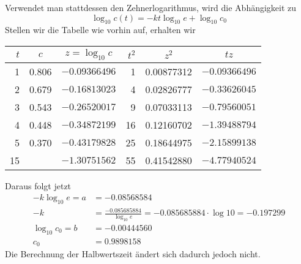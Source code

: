 \begin{loesung}
Verwendet man stattdessen den Zehnerlogarithmus, wird die Abhängigkeit
zu
$$
\log_{10} c(t)=-kt\log_{10}e+\log_{10}c_0
$$
Stellen wir die Tabelle wie vorhin auf, erhalten wir
\begin{center}
\begin{tabular}{rccrcc}
$t$&$c$&$z=\log_{10} c$&$t^2$&$z^2$&$tz$\\
\hline
1&0.806&$-0.09366496$&1&0.00877312&$-0.09366496$\\
2&0.679&$-0.16813023$&4&0.02826777&$-0.33626045$\\
3&0.543&$-0.26520017$&9&0.07033113&$-0.79560051$\\
4&0.448&$-0.34872199$&16&0.12160702&$-1.39488794$\\
5&0.370&$-0.43179828$&25&0.18644975&$-2.15899138$\\
\hline
15&    &$-1.30751562$&55&0.41542880&$-4.77940524$\\
\end{tabular}
\end{center}
Daraus folgt jetzt
\begin{align*}
-k\log_{10}e=a&=-0.08568584\\
-k&=\frac{-0.085685884}{\log_{10}e}=-0.085685884\cdot \log 10
=
-0.197299
\\
\log_{10}c_0=b&=-0.00444560\\
c_0&=0.9898158
\end{align*}
Die Berechnung der Halbwertszeit ändert sich dadurch jedoch
nicht.
\end{loesung}

